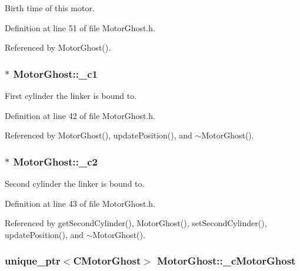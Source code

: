 Birth time of this motor. 



Definition at line 51 of file Motor\+Ghost.\+h.



Referenced by Motor\+Ghost().

\hypertarget{classMotorGhost_a0725de6b61fc0eaaa50bf0cb33f933dc}{
\subsubsection[{\+\_\+c1}]{$\ast$ Motor\+Ghost\+::\+\_\+c1\hspace{0.3cm}{\ttfamily [private]}}}\label{classMotorGhost_a0725de6b61fc0eaaa50bf0cb33f933dc}


First cylinder the linker is bound to. 



Definition at line 42 of file Motor\+Ghost.\+h.



Referenced by Motor\+Ghost(), update\+Position(), and $\sim$\+Motor\+Ghost().

\hypertarget{classMotorGhost_a0d7606f2ce76db16bb10829fd92a971b}{
\subsubsection[{\+\_\+c2}]{$\ast$ Motor\+Ghost\+::\+\_\+c2\hspace{0.3cm}{\ttfamily [private]}}}\label{classMotorGhost_a0d7606f2ce76db16bb10829fd92a971b}


Second cylinder the linker is bound to. 



Definition at line 43 of file Motor\+Ghost.\+h.



Referenced by get\+Second\+Cylinder(), Motor\+Ghost(), set\+Second\+Cylinder(), update\+Position(), and $\sim$\+Motor\+Ghost().

\hypertarget{classMotorGhost_a9e16cc127c973fe3c8e559daa5922e97}{
\subsubsection[{\+\_\+c\+Motor\+Ghost}]{\setlength{\rightskip}{0pt plus 5cm}unique\+\_\+ptr$<${\bf C\+Motor\+Ghost}$>$ Motor\+Ghost\+::\+\_\+c\+Motor\+Ghost\hspace{0.3cm}{\ttfamily [private]}}}\label{classMotorGhost_a9e16cc127c973fe3c8e559daa5922e97}



